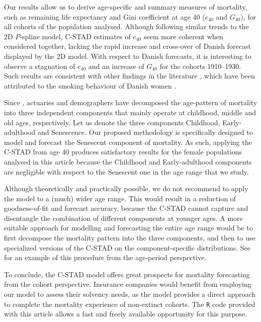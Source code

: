 \documentclass[11pt, a4paper]{article}
\begin{document}
Our results allow us to derive age-specific and summary measures of mortality, such as remaining life expectancy and Gini coefficient at age 40 ($e_{40}$ and $G_{40}$), for all cohorts of the population analysed. Although following similar trends to the 2D $P$-spline model, C-STAD estimates of $e_{40}$ seem more coherent when considered together, lacking the rapid increase and cross-over of Danish forecast displayed by the 2D model. With respect to Danish forecasts, it is interesting to observe a stagnation of $e_{40}$ and an increase of $G_{40}$ for the cohorts 1910--1930. Such results are consistent with other findings in the literature \cite[see, e.g., Fig.~4 in][]{jacobsen2002long}, which have been attributed to the smoking behaviour of Danish women \citep{jacobsen2006causes,lindahl2016did}. 

{\color{red}
Since \cite{thiele1871mathematical}, actuaries and demographers have decomposed the age-pattern of mortality into three independent components that mainly operate at childhood, middle and old ages, respectively. Let us denote the three components Childhood, Early-adulthood and Senescence. Our proposed methodology is specifically designed to model and forecast the Senescent component of mortality. As such, applying the C-STAD from age 40 produces satisfactory results for the female populations analysed in this article because the Childhood and Early-adulthood components are negligible with respect to the Senescent one in the age range that we study. 
	
Although theoretically and practically possible, we do not recommend to apply the model to a (much) wider age range. This would result in a reduction of goodness-of-fit and forecast accuracy, because the C-STAD cannot capture and disentangle the combination of different components at younger ages. A more suitable approach for modelling and forecasting the entire age range would be to first decompose the mortality pattern into the three components, and then to use specialized versions of the C-STAD on the component-specific distributions. See \cite{basellini2019three} for an example of this procedure from the age-period perspective.

}

To conclude, the C-STAD model offers great prospects for mortality forecasting from the cohort perspective. Insurance companies would benefit from employing our model to assess their solvency needs, as the model provides a direct approach to complete the mortality experience  of non-extinct cohorts. The \texttt{R} code provided with this article allows a fast and freely available opportunity for this purpose. 
\end{document}
